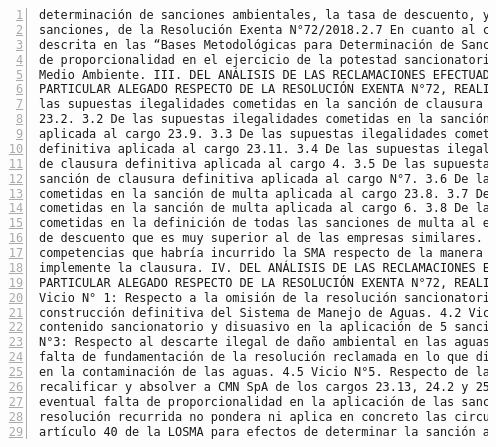 \begin{Verbatim}[frame=lines, label=Elavoración propia -  Ejemplo de Contexto enviado por el Chatbot a OpenAI
				, fontsize=\footnotesize, numbers=left
				, baselinestretch=0.4
				, formatcom=\color{gray}]
determinación de sanciones ambientales, la tasa de descuento, y la proporcionalidad de las
sanciones, de la Resolución Exenta N°72/2018.2.7 En cuanto al cálculo de la Tasa de Descuento
descrita en las “Bases Metodológicas para Determinación de Sanciones Ambientales”. El estándar
de proporcionalidad en el ejercicio de la potestad sancionatoria de la Superintendencia del
Medio Ambiente. III. DEL ANÁLISIS DE LAS RECLAMACIONES EFECTUADAS PARA CADA CARGO EN
PARTICULAR ALEGADO RESPECTO DE LA RESOLUCIÓN EXENTA N°72, REALIZADO EN CAUSA R-5-2018. 3.1 De
las supuestas ilegalidades cometidas en la sanción de clausura definitiva aplicada al cargo
23.2. 3.2 De las supuestas ilegalidades cometidas en la sanción de clausura definitiva
aplicada al cargo 23.9. 3.3 De las supuestas ilegalidades cometidas en la sanción de clausura
definitiva aplicada al cargo 23.11. 3.4 De las supuestas ilegalidades cometidas en la sanción
de clausura definitiva aplicada al cargo 4. 3.5 De las supuestas ilegalidades cometidas en la
sanción de clausura definitiva aplicada al cargo N°7. 3.6 De las supuestas ilegalidades
cometidas en la sanción de multa aplicada al cargo 23.8. 3.7 De las supuestas ilegalidades
cometidas en la sanción de multa aplicada al cargo 6. 3.8 De las supuestas ilegalidades
cometidas en la definición de todas las sanciones de multa al establecer un criterio de tasa
de descuento que es muy superior al de las empresas similares. 3.9 Del supuesto exceso en las
competencias que habría incurrido la SMA respecto de la manera en que pretende que se
implemente la clausura. IV. DEL ANÁLISIS DE LAS RECLAMACIONES EFECTUADAS PARA CADA CARGO EN
PARTICULAR ALEGADO RESPECTO DE LA RESOLUCIÓN EXENTA N°72, REALIZADO EN CAUSA R-6-2018. 4.1
Vicio N° 1: Respecto a la omisión de la resolución sancionatoria de ordenar a CMN SpA la
construcción definitiva del Sistema de Manejo de Aguas. 4.2 Vicio N°2: Sobre la falta de
contenido sancionatorio y disuasivo en la aplicación de 5 sanciones de clausura. 4.3 Vicio
N°3: Respecto al descarte ilegal de daño ambiental en las aguas. 4.4 Vicio N°4: De la supuesta
falta de fundamentación de la resolución reclamada en lo que dice relación con la causalidad
en la contaminación de las aguas. 4.5 Vicio N°5. Respecto de la motivación de la SMA para
recalificar y absolver a CMN SpA de los cargos 23.13, 24.2 y 25. 4.6 Vicio N°6: Sobre la
eventual falta de proporcionalidad en la aplicación de las sanciones. 4.7 Vicio N°7: La
resolución recurrida no pondera ni aplica en concreto las circunstancias que contempla el
artículo 40 de la LOSMA para efectos de determinar la sanción a aplicar a cada infracción. 4.8

\end{Verbatim}
